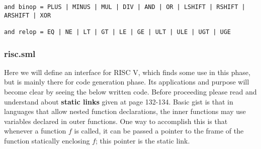 \begin{verbatim}
and binop = PLUS | MINUS | MUL | DIV | AND | OR | LSHIFT | RSHIFT | ARSHIFT | XOR

and relop = EQ | NE | LT | GT | LE | GE | ULT | ULE | UGT | UGE
\end{verbatim}

\subsubsection{risc.sml}

Here we will define an interface for RISC V, which finds some use in this phase, but is mainly there for code generation phase. Its applications and purpose will become clear by seeing the below written code. Before proceeding please read and understand about \textbf{static links} given at page 132-134. Basic gist is that in languages that allow nested function declarations, the inner functions may use variables declared in outer functions. One way to accomplish this is that whenever a function $f$ is called, it can be passed a pointer to the frame of the function statically enclosing $f$; this pointer is the static link. 

